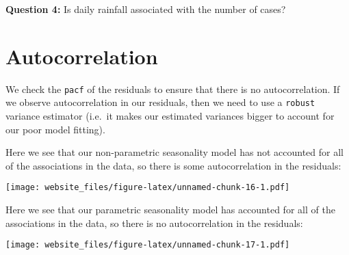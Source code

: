 \documentclass[]{book}
\newenvironment{Shaded}{\begin{snugshade}}{\end{snugshade}}
\newcommand{\KeywordTok}[1]{\textcolor[rgb]{0.13,0.29,0.53}{\textbf{#1}}}
\newcommand{\DataTypeTok}[1]{\textcolor[rgb]{0.13,0.29,0.53}{#1}}
\newcommand{\StringTok}[1]{\textcolor[rgb]{0.31,0.60,0.02}{#1}}
\newcommand{\OperatorTok}[1]{\textcolor[rgb]{0.81,0.36,0.00}{\textbf{#1}}}
\newcommand{\ErrorTok}[1]{\textcolor[rgb]{0.64,0.00,0.00}{\textbf{#1}}}
\newcommand{\NormalTok}[1]{#1}
\begin{document}
\textbf{Question 4:} Is daily rainfall associated with the number of
cases?

\section{Autocorrelation}\label{autocorrelation-1}

We check the \texttt{pacf} of the residuals to ensure that there is no
autocorrelation. If we observe autocorrelation in our residuals, then we
need to use a \texttt{robust} variance estimator (i.e.~it makes our
estimated variances bigger to account for our poor model fitting).

Here we see that our non-parametric seasonality model has not accounted
for all of the associations in the data, so there is some
autocorrelation in the residuals:

\begin{Shaded}
\end{Shaded}

\texttt{[image: website\_files/figure-latex/unnamed-chunk-16-1.pdf]}

Here we see that our parametric seasonality model has accounted for all
of the associations in the data, so there is no autocorrelation in the
residuals:

\begin{Shaded}
\end{Shaded}

\texttt{[image: website\_files/figure-latex/unnamed-chunk-17-1.pdf]}
\end{document}
